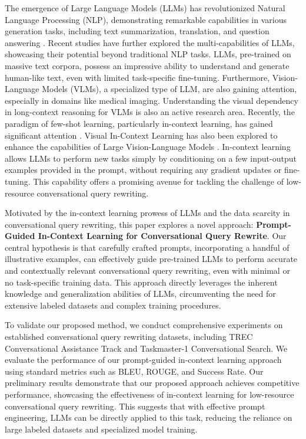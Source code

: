 The emergence of Large Language Models (LLMs) has revolutionized Natural Language Processing (NLP), demonstrating remarkable capabilities in various generation tasks, including text summarization, translation, and question answering \cite{LLMsFewShotLearners2024}.  Recent studies have further explored the multi-capabilities of LLMs, showcasing their potential beyond traditional NLP tasks. LLMs, pre-trained on massive text corpora, possess an impressive ability to understand and generate human-like text, even with limited task-specific fine-tuning.  Furthermore, Vision-Language Models (VLMs), a specialized type of LLM, are also gaining attention, especially in domains like medical imaging.  Understanding the visual dependency in long-context reasoning for VLMs is also an active research area. Recently, the paradigm of few-shot learning, particularly in-context learning, has gained significant attention \cite{LLMsFewShotLearners2024}.  Visual In-Context Learning has also been explored to enhance the capabilities of Large Vision-Language Models \cite{zhou2024visual}. In-context learning allows LLMs to perform new tasks simply by conditioning on a few input-output examples provided in the prompt, without requiring any gradient updates or fine-tuning. This capability offers a promising avenue for tackling the challenge of low-resource conversational query rewriting.

Motivated by the in-context learning prowess of LLMs and the data scarcity in conversational query rewriting, this paper explores a novel approach: \textbf{Prompt-Guided In-Context Learning for Conversational Query Rewrite}. Our central hypothesis is that carefully crafted prompts, incorporating a handful of illustrative examples, can effectively guide pre-trained LLMs to perform accurate and contextually relevant conversational query rewriting, even with minimal or no task-specific training data. This approach directly leverages the inherent knowledge and generalization abilities of LLMs, circumventing the need for extensive labeled datasets and complex training procedures.

To validate our proposed method, we conduct comprehensive experiments on established conversational query rewriting datasets, including TREC Conversational Assistance Track and Taskmaster-1 Conversational Search. We evaluate the performance of our prompt-guided in-context learning approach using standard metrics such as BLEU, ROUGE, and Success Rate. Our preliminary results demonstrate that our proposed approach achieves competitive performance, showcasing the effectiveness of in-context learning for low-resource conversational query rewriting. This suggests that with effective prompt engineering, LLMs can be directly applied to this task, reducing the reliance on large labeled datasets and specialized model training.

